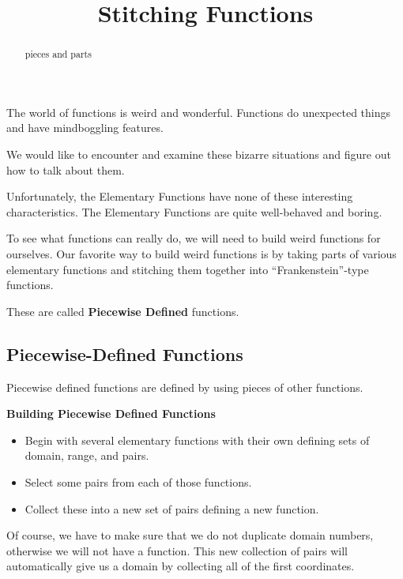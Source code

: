 \documentclass{ximera}
\title{Stitching Functions}
\begin{document}
\begin{abstract}
pieces and parts
\end{abstract}
\maketitle




The world of functions is weird and wonderful. Functions do unexpected things and have mindboggling features.

We would like to encounter and examine these bizarre situations and figure out how to talk about them.

Unfortunately, the Elementary Functions have none of these interesting characteristics. The Elementary Functions are quite well-behaved and boring.

To see what functions can really do, we will need to build weird functions for ourselves. Our favorite way to build weird functions is by taking parts of various elementary functions and stitching them together into ``Frankenstein''-type functions.

These are called \textbf{Piecewise Defined} functions.









\subsection*{Piecewise-Defined Functions}

Piecewise defined functions are defined by using pieces of other functions. 


\begin{procedure} \textbf{\textcolor{purple!30!blue}{Building Piecewise Defined Functions}} 

\begin{itemize}
\item Begin with several elementary functions with their own defining sets of domain, range, and pairs.  
\item Select some pairs from each of those functions. 
\item Collect these into a new set of pairs defining a new function.  
\end{itemize}

\end{procedure}

Of course, we have to make sure that we do not duplicate domain numbers, otherwise we will not have a function.  This new collection of pairs will automatically give us a domain by collecting all of the first coordinates.
\end{document}
